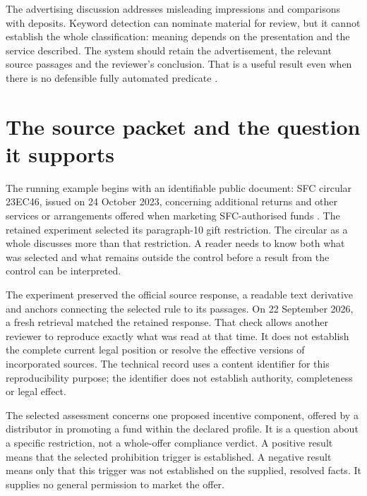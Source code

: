 The advertising discussion addresses misleading impressions and comparisons with
deposits. Keyword detection can nominate material for review, but it cannot
establish the whole classification: meaning depends on the presentation and the
service described. The system should retain the advertisement, the relevant
source passages and the reviewer's conclusion. That is a useful result even when
there is no defensible fully automated predicate
\citep[paras.~15--17]{sfcmarketing}.

\section{The source packet and the question it supports}
\label{merge:M02:00}

\label{sec:circular-packet}
The running example begins with an identifiable public document: SFC circular
23EC46, issued on 24 October 2023, concerning additional returns and other
services or arrangements offered when marketing SFC-authorised funds
\citep{sfcmarketing}. The retained experiment selected its paragraph-10 gift
restriction. The circular as a whole discusses more than that restriction. A
reader needs to know both what was selected and what remains outside the control
before a result from the control can be interpreted.

The experiment preserved the official source response, a readable text
derivative and anchors connecting the selected rule to its passages. On
22 September 2026, a fresh retrieval matched the retained response. That check
allows another reviewer to reproduce exactly what was read at that time. It
does not establish the complete current legal position or resolve the effective
versions of incorporated sources. The technical record uses a content identifier
for this reproducibility purpose; the identifier does not establish authority,
completeness or legal effect.


The selected assessment concerns one proposed incentive component, offered by a
distributor in promoting a fund within the declared profile. It is a question
about a specific restriction, not a whole-offer compliance verdict. A positive
result means that the selected prohibition trigger is established. A negative
result means only that this trigger was not established on the supplied,
resolved facts. It supplies no general permission to market the offer.


